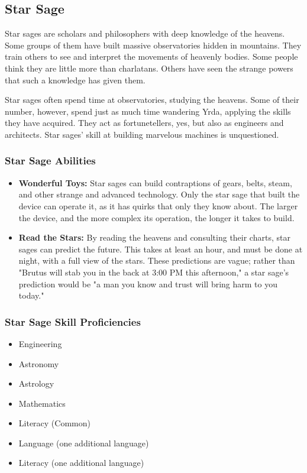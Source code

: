 \begin{multicols}{2}
\subsection{Star Sage}

Star sages are scholars and philosophers with deep knowledge of the heavens.
Some groups of them have built massive observatories hidden in mountains. They
train others to see and interpret the movements of heavenly bodies. Some people
think they are little more than charlatans. Others have seen the strange powers
that such a knowledge has given them.

Star sages often spend time at observatories, studying the heavens. Some of their
number, however, spend just as much time wandering Yrda, applying the skills they
have acquired. They act as fortunetellers, yes, but also as engineers and architects.
Star sages' skill at building marvelous machines is unquestioned.

\subsubsection{Star Sage Abilities}

\begin{itemize}
  \item \textbf{Wonderful Toys:} Star sages can build contraptions of gears, belts,
    steam, and other strange and advanced technology. Only the star sage that built
    the device can operate it, as it has quirks that only they know about. The larger
    the device, and the more complex its operation, the longer it takes to build.
  \item \textbf{Read the Stars:} By reading the heavens and consulting their charts,
    star sages can predict the future. This takes at least an hour, and must be done
    at night, with a full view of the stars. These predictions are vague; rather than
    "Brutus will stab you in the back at 3:00 PM this afternoon," a star sage's prediction
    would be "a man you know and trust will bring harm to you today."
\end{itemize}

\subsubsection{Star Sage Skill Proficiencies}

\begin{itemize}
  \item Engineering
  \item Astronomy
  \item Astrology
  \item Mathematics
  \item Literacy (Common)
  \item Language (one additional language)
  \item Literacy (one additional language)
\end{itemize}


\end{multicols}
